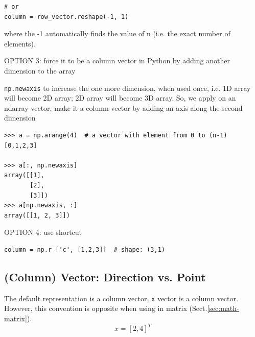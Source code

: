 \begin{enumerate}
\begin{lstlisting}
# or
column = row_vector.reshape(-1, 1)
\end{lstlisting}
where the -1 automatically finds the value of n (i.e. the exact number of elements).


OPTION 3: force it to be a column vector in Python by adding another dimension to the array

\verb!np.newaxis! to increase the one more dimension, when used once, i.e. 1D
array will become 2D array; 2D array will become 3D array.
So, we apply on an ndarray vector, make it a column vector by adding an axis
along the second dimension
\begin{lstlisting}
>>> a = np.arange(4)  # a vector with element from 0 to (n-1)
[0,1,2,3]

>>> a[:, np.newaxis]
array([[1],
       [2],
       [3]])
>>> a[np.newaxis, :]
array([[1, 2, 3]])
\end{lstlisting}


OPTION 4: use shortcut
\begin{lstlisting}
column = np.r_['c', [1,2,3]]  # shape: (3,1)
\end{lstlisting}

\end{enumerate}



\subsection{(Column) Vector: Direction vs. Point}

The default representation is a column vector, \verb!x! vector is a column
vector. However, this convention is opposite when using in matrix
(Sect.\ref{sec:math-matrix}).
\begin{equation}
x = [2, 4]^T
\end{equation}

